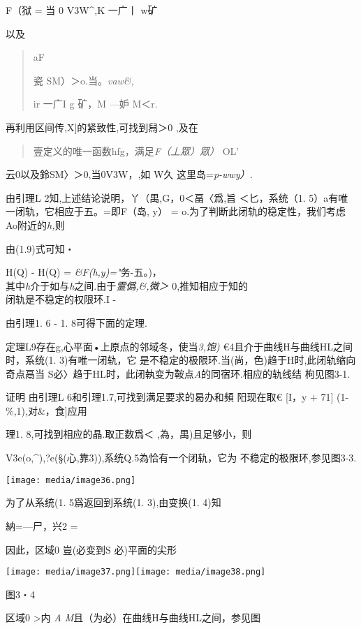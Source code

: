 \documentclass{article}
\begin{document}
F（狱 = 当 0 V3W\^{},K 一广丨 w矿

以及

\begin{quote}
aF

瓷 SM）＞o.当。\emph{vaw\&,}

ir 一广I g 矿，M ---妒 \textbar{}M＜r.
\end{quote}

再利用区间传,X{]}的紧致性,可找到舄＞0 ,及在

\begin{quote}
壹定义的唯一函数hfg，满足\emph{F（丄眾）眾）} OL'
\end{quote}

云0以及鈴SM〉＞0,当0V3W，,如 W久 这里岛=\emph{p-wwy）.}

由引理L 2知,上述结论说明，丫（禺,G，0＜畐〈爲,旨 ＜匕，系统（1.
5）a有唯一闭轨，它相应于五。=即F（岛, y） =
o.为了判断此闭轨的稳定性，我们考虑Ao附近的\emph{h,}则

由(1.9)式可知・

H(Q) - H(Q) = \emph{\&F(h,y)="}务-五。)，\\
其中\emph{h}介于如与\emph{h}之间.由于\emph{霊僞,\&,微＞}
0,推知相应于知的\\
闭轨是不稳定的权限环.I -

由引理1. 6 - 1. 8可得下面的定理.

定理L9存在g,心平面•上原点的邻域冬，使当\emph{3,饱)}
€4且介于曲线H与曲线HL之间时，系统(1. 3)有唯一闭轨，它
是不稳定的极限环.当(尚，色)趋于H时,此闭轨缩向奇点鬲当
S必〉趋于HL时，此闭執变为鞍点\emph{A}的同宿环.相应的轨线结 枸见图3-1.

证明 由引理L 6和引理1.7,可找到满足要求的曷办和頻 阳现在取€ {[}I，y +
71{]} (1-\%,1),对\&，食{]}应用

理1. 8,可找到相应的晶.取正数爲＜ ,為，禺)且足够小，则

V3e(o,\^{}),?e(§(心,靠3)),系统Q.5為恰有一个闭轨，它为
不稳定的极限环,参见图3-3.

\texttt{[image: media/image36.png]}

为了从系统(1. 5爲返回到系统(1. 3),由变换(1. 4)知

納=---尸，兴2 =

因此，区域0 豈(必变到S 必)平面的尖形

\texttt{[image: media/image37.png]}\texttt{[image: media/image38.png]}

图3・4

区域0 \textgreater{}内 \emph{A M}且（为必）在曲线H与曲线HL之间，参见图
\end{document}
